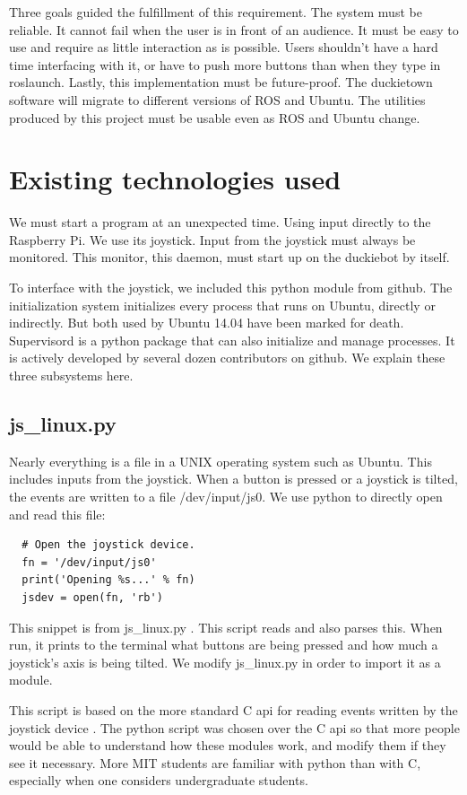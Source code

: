 \documentclass[titlepage]{article}
\begin{document}
Three goals guided the fulfillment of this requirement. The system must be reliable. It cannot fail when the user is in front of an audience. It must be easy to use and require as little interaction as is possible. Users shouldn't have a hard time interfacing with it, or have to push more buttons than when they type in roslaunch.
Lastly, this implementation must be future-proof. The duckietown software will migrate to  different versions of ROS and Ubuntu. The utilities produced by this project must be usable even as ROS and Ubuntu change. 
\section{Existing technologies used} 
We must start a program at an unexpected time. Using input directly to the Raspberry Pi. We use its joystick. Input from the joystick must always be monitored. This monitor, this daemon, must start up on the duckiebot by itself. 

To interface with the joystick, we included this python module from github. 
The initialization system initializes every process that runs on Ubuntu, directly or indirectly. But both used by Ubuntu 14.04 have been marked for death.
Supervisord is a python package that can also initialize and manage processes. It is actively developed by several dozen contributors on github.
We explain these three subsystems here. 
\subsection{js\_linux.py}
Nearly everything is a file in a UNIX operating system such as Ubuntu. This includes inputs from the joystick. When a button is pressed or a joystick is tilted, the events are written to a file /dev/input/js0. We use python to directly open and read this file:

\begin{lstlisting}
  # Open the joystick device.
  fn = '/dev/input/js0' 
  print('Opening %s...' % fn)
  jsdev = open(fn, 'rb')
\end{lstlisting}

This snippet is from js\_linux.py \cite{rdb}. This script reads and also parses this. When run, it prints to the terminal what buttons are being pressed and how much a joystick's axis is being tilted. We modify js\_linux.py in order to import it as a module. 

This script is based on the more standard C api for reading events written by the joystick device \cite{linux joystick}. The python script was chosen over the C api so that more people would be able to understand how these modules work, and modify them if they see it necessary. More MIT students are familiar with python than with C, especially when one considers undergraduate students.
\end{document}
